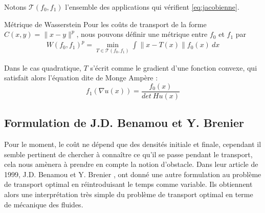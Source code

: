 \documentclass[a4paper,12pt]{article}
\begin{document}
Notons $\mathcal{T}(f_0,f_1)$ l'ensemble des applications qui vérifient \eqref{eq:jacobienne}.
\begin{definition}{Métrique de Wasserstein}
Pour les coûts de transport de la forme $C(x,y) = \|x - y\|^p$, nous pouvons définir une métrique entre $f_0$ et $f_1$ par
\begin{align*}
W(f_0,f_1)^p=\min_{T\in\mathcal{T}(f_0,f_1)} \int \|x-T(x)\|f_0(x)\ dx
\end{align*} 

\end{definition}


Dans le cas quadratique, $T$ s'écrit comme le gradient d'une fonction convexe, qui satisfait alors l'équation dite de Monge Ampère : 
\begin{equation}
\tag{MA}
f_1(\nabla u(x)) = \frac{f_0(x)}{det\ H u(x)}
\label{eq:mongemapere}
\end{equation}






\subsection{Formulation de J.D. Benamou et Y. Brenier}
Pour le moment, le coût ne dépend que des densités initiale et finale, cependant il semble pertinent de chercher à connaître ce qu'il se passe pendant le transport, cela nous amènera à prendre en compte la notion d'obstacle. 
Dans leur article de 1999, J.D. Benamou et Y. Brenier \cite{benamoubrenier}, ont donné une autre formulation au problème de transport optimal en réintroduisant le temps comme variable. Ils obtiennent alors une interprétation très simple du problème de transport optimal en terme de mécanique des fluides. 
\end{document}
